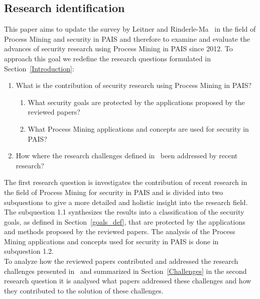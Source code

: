 \documentclass[runningheads]{llncs}
\begin{document}
\subsection{Research identification}\label{Identification}
This paper aims to update the survey by Leitner and Rinderle-Ma~\cite{Leitner2014273} in the field of Process Mining and security in PAIS  and therefore to examine and evaluate the advances of security research using Process Mining in PAIS since 2012.
To approach this goal we redefine the research questions formulated in Section~\ref{Introduction}:
\begin{enumerate}
    \item What is the contribution of security research using Process Mining in PAIS\@?
          \begin{enumerate}
              \item What security goals are protected by the applications proposed by the reviewed papers?
              \item What Process Mining applications and concepts are used for security in PAIS\@?
          \end{enumerate}
    \item How where the research challenges defined in~\cite{Leitner2014273} been addressed by recent research?
\end{enumerate}
The first research question is investigates the contribution of recent research in the field of Process Mining for security in PAIS and is divided into two subquestions to give a more detailed and holistic insight into the research field.
The subquestion 1.1 synthesizes the results into a classification of the security goals, as defined in Section~\ref{goals_def}, that are protected by the applications and methods proposed by the reviewed papers.
The analysis of the Process Mining applications and concepts used for security in PAIS is done in subquestion 1.2.\\
To analyze how the reviewed papers contributed and addressed the research challenges presented in~\cite{Leitner2014273} and summarized in Section~\ref{Challenges} in the second research question it is analysed what papers addressed these challenges
and how they contributed to the solution of these challenges.
\end{document}
